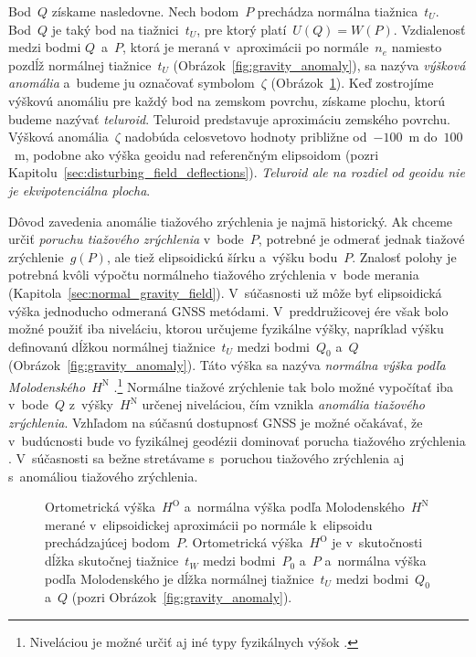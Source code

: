 \documentclass[a4paper, 12pt]{book}
\begin{document}
Bod~$Q$ získame nasledovne.  Nech bodom~$P$ prechádza normálna tiažnica~$t_U$.  
Bod~$Q$ je taký bod na tiažnici~$t_U$, pre ktorý platí~$U(Q) = W(P)$.  
Vzdialenosť medzi bodmi $Q$~a~$P$, ktorá je meraná v~aproximácii po 
normále~$n_e$ namiesto pozdĺž normálnej tiažnice~$t_U$ 
(Obrázok~\ref{fig:gravity_anomaly}), sa nazýva \emph{výšková anomália} a~budeme 
ju označovať symbolom~$\zeta$ (Obrázok~\ref{fig:heights}).  Keď zostrojíme 
výškovú anomáliu pre každý bod na zemskom povrchu, získame plochu, ktorú budeme 
nazývať \emph{teluroid}.  Teluroid predstavuje aproximáciu zemského povrchu.  
Výšková anomália~$\zeta$ nadobúda celosvetovo hodnoty približne od~$-100$~m 
do~$100$~m, podobne ako výška geoidu nad referenčným elipsoidom (pozri 
Kapitolu~\ref{sec:disturbing_field_deflections}).  \emph{Teluroid ale na 
rozdiel od geoidu nie je ekvipotenciálna plocha}.

Dôvod zavedenia anomálie tiažového zrýchlenia je najmä historický.  Ak chceme 
určiť \emph{poruchu tiažového zrýchlenia} v~bode~$P$, potrebné je odmerať 
jednak tiažové zrýchlenie~$g(P)$, ale tiež elipsoidickú šírku a~výšku bodu~$P$.  
Znalosť polohy je potrebná kvôli výpočtu normálneho tiažového zrýchlenia v~bode 
merania (Kapitola~\ref{sec:normal_gravity_field}).  V~súčasnosti už môže byť 
elipsoidická výška jednoducho odmeraná GNSS metódami.  V~preddružicovej ére 
však bolo možné použiť iba niveláciu, ktorou určujeme fyzikálne výšky, 
napríklad výšku definovanú dĺžkou normálnej tiažnice~$t_U$ medzi bodmi~$Q_0$ 
a~$Q$ (Obrázok~\ref{fig:gravity_anomaly}).  Táto výška sa nazýva \emph{normálna 
výška podľa Molodenského}~$H^\mathrm{N}$ 
\parencite{MoritzPhysicalGeodesy}.\footnote{Niveláciou je možné určiť aj iné 
typy fyzikálnych výšok \parencite[pozri][]{MoritzPhysicalGeodesy}.}  Normálne 
tiažové zrýchlenie tak bolo možné vypočítať iba v~bode~$Q$ 
z~výšky~$H^\mathrm{N}$ určenej niveláciou, čím vznikla \emph{anomália tiažového 
zrýchlenia}.  Vzhľadom na súčasnú dostupnosť GNSS je možné očakávať, že 
v~budúcnosti bude vo fyzikálnej geodézii dominovať porucha tiažového zrýchlenia 
\parencite{MoritzPhysicalGeodesy}.  V~súčasnosti sa bežne stretávame s~poruchou 
tiažového zrýchlenia aj s~anomáliou tiažového zrýchlenia.

\begin{figure}[bt]
\centering

\caption{Ortometrická výška~$H^\mathrm{O}$ a~normálna výška podľa 
Molodenského~$H^\mathrm{N}$ merané v~elipsoidickej aproximácii po normále 
k~elipsoidu prechádzajúcej bodom~$P$.  Ortometrická výška~$H^\mathrm{O}$ je 
v~skutočnosti dĺžka skutočnej tiažnice~$t_W$ medzi bodmi~$P_0$ a~$P$ a~normálna 
výška podľa Molodenského je dĺžka normálnej tiažnice~$t_U$ medzi bodmi~$Q_0$ 
a~$Q$ (pozri Obrázok~\ref{fig:gravity_anomaly}).}
\label{fig:heights}
\end{figure}
\end{document}
